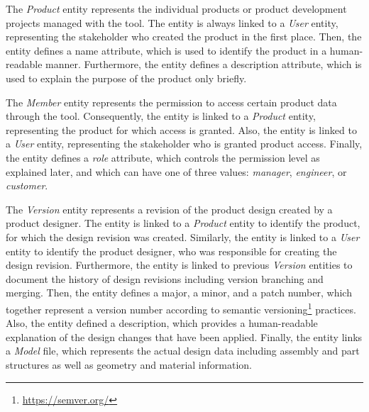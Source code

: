     The \textit{Product} entity represents the individual products or product development projects managed with the tool.
    The entity is always linked to a \textit{User} entity, representing the stakeholder who created the product in the first place.
    Then, the entity defines a name attribute, which is used to identify the product in a human-readable manner.
    Furthermore, the entity defines a description attribute, which is used to explain the purpose of the product only briefly.

    The \textit{Member} entity represents the permission to access certain product data through the tool.
    Consequently, the entity is linked to a \textit{Product} entity, representing the product for which access is granted.
    Also, the entity is linked to a \textit{User} entity, representing the stakeholder who is granted product access.
    Finally, the entity defines a \textit{role} attribute, which controls the permission level as explained later, and which can have one of three values: \textit{manager}, \textit{engineer}, or \textit{customer}.

    The \textit{Version} entity represents a revision of the product design created by a product designer.
    The entity is linked to a \textit{Product} entity to identify the product, for which the design revision was created.
    Similarly, the entity is linked to a \textit{User} entity to identify the product designer, who was responsible for creating the design revision.
    Furthermore, the entity is linked to previous \textit{Version} entities to document the history of design revisions including version branching and merging.
    Then, the entity defines a major, a minor, and a patch number, which together represent a version number according to semantic versioning\footnote{\url{https://semver.org/}} practices.
    Also, the entity defined a description, which provides a human-readable explanation of the design changes that have been applied.
    Finally, the entity links a \textit{Model} file, which represents the actual design data including assembly and part structures as well as geometry and material information.
    
